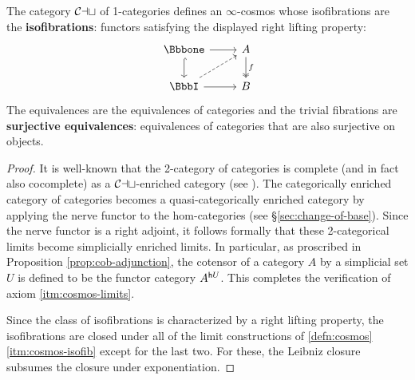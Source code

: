 \begin{prop}\label{prop:cat-cosmos}
The category ${\mathord{\mathcal{Cat}}}$ of 1-cat\-e\-go\-ri\-es defines an $\infty$-cosmos whose isofibrations are the \textbf{isofibrations}: functors satisfying the displayed right lifting property:
\[
\begin{tikzcd}
\catone \arrow[d, hook] \arrow[r] & A \arrow[d, "f", two heads] \\ \iso \arrow[r] \arrow[ur, dashed] & B
\end{tikzcd}
\]
The equivalences are the equivalences of categories and the trivial fibrations are \textbf{surjective equivalences}: equivalences of categories that are also surjective on objects.
\end{prop}
\begin{proof}
It is well-known that the 2-category of categories is complete (and in fact also cocomplete) as a ${\mathord{\mathcal{Cat}}}$-enriched category (see %
  \cite{Kelly:1989eo}). The categorically enriched category of categories becomes a quasi-categorically enriched category by applying the nerve functor to the hom-categories (see \S\ref{sec:change-of-base}). Since the nerve functor is a right adjoint, it follows formally that these 2-categorical limits become simplicially enriched limits. In particular, as proscribed in Proposition \ref{prop:cob-adjunction}, the cotensor of a category $A$ by a simplicial set $U$ is defined to be the functor category $A^{{\mathord{\mathsf{h}}}{U}}$. This completes the verification of axiom \ref{itm:cosmos-limits}.

Since the class of isofibrations is characterized by a right lifting property, %
  the isofibrations are closed under all of the limit constructions of  \ref{defn:cosmos}\ref{itm:cosmos-isofib} except for the last two. %
  For these, the Leibniz closure subsumes the closure under exponentiation.


\end{proof}
